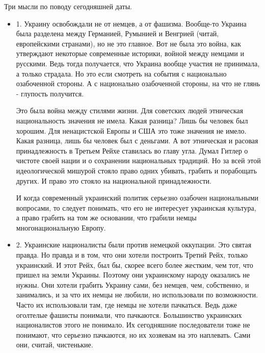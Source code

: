  
 
 

Три мысли по поводу сегодняшней даты.

\begin{itemize}
	

\item 1. Украину освобождали не от немцев, а от фашизма. Вообще-то Украина была
разделена между Германией, Румынией и Венгрией (читай, европейскими странами),
но не это главное.  Вот не была это война, как утверждают некоторые современные
историки, войной между немцами и русскими. Ведь тогда получается, что Украина
вообще участия не принимала, а только страдала. Но это если смотреть на события
с национально озабоченной стороны. А с национально озабоченной стороны, на что
не глянь - глупость получится. 

Это была война между стилями жизни. Для советских людей этническая
национальность значения не имела. Какая разница? Лишь бы человек был хорошим.
Для ненацистской Европы и США это тоже значения не имело. Какая разница, лишь
бы человек был с деньгами. А вот этническая и расовая принадлежность в Третьем
Рейхе ставилась во главу угла. Думал Гитлер о чистоте своей нации и о
сохранении национальных традиций. Но за всей этой идеологической мишурой стояло
право одних убивать, грабить и порабощать других. И право это стояло на
национальной принадлежности. 

И когда современный украинский политик серьезно озабочен национальными
вопросами, то следует понимать, что его не интересует украинская культура, а
право грабить на том же основании, что грабили немцы многонациональную Европу. 

\item 2. Украинские националисты были против немецкой оккупации. Это святая правда.
Но правда и в том, что они хотели построить Третий Рейх, только украинский. И
этот Рейх, был бы, скорее всего более жестким, чем тот, что пришел на земли
Украины. Поэтому они украинскому народу оказались не нужны. Они хотели грабить
Украину сами, без немцев, чем, собственно, и занимались, и за что их немцы не
любили, но использовали по возможности. Часто их использовали там, где немцы не
хотели пачкаться. Ведь даже оголтелые фашисты понимали, что пачкаются.
Большинство украинских националистов этого не понимало. Их сегодняшние
последователи тоже не понимают, что серьезно пачкаются, но их хозяевам на это
наплевать. Сами они, считай, чистенькие.


\end{itemize}
